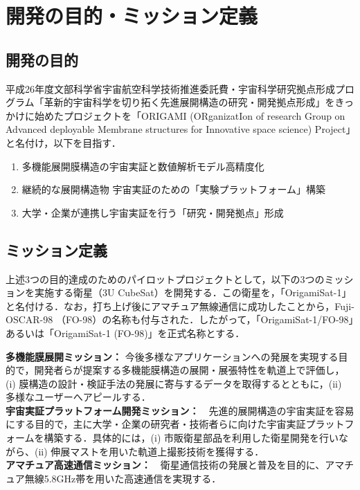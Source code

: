 \section{開発の目的・ミッション定義}

\subsection{開発の目的}

平成26年度文部科学省宇宙航空科学技術推進委託費・宇宙科学研究拠点形成プログラム「革新的宇宙科学を切り拓く先進展開構造の研究・開発拠点形成」をきっかけに始めたプロジェクトを「ORIGAMI (ORganizatIon of research Group on Advanced deployable Membrane structures for Innovative space science) Project」と名付け，以下を目指す．
\begin{enumerate}
\item 多機能展開膜構造の宇宙実証と数値解析モデル高精度化
\item 継続的な展開構造物 宇宙実証のための「実験プラットフォーム」構築
\item 大学・企業が連携し宇宙実証を行う「研究・開発拠点」形成
\end{enumerate}

\subsection{ミッション定義}

上述3つの目的達成のためのパイロットプロジェクトとして，以下の3つのミッションを実施する衛星（3U CubeSat）を開発する．この衛星を，「OrigamiSat-1」と名付ける．なお，打ち上げ後にアマチュア無線通信に成功したことから，Fuji-OSCAR-98 （FO-98）の名称も付与された．したがって，「OrigamiSat-1/FO-98」あるいは「OrigamiSat-1 (FO-98)」を正式名称とする．
\begin{screen}
\noindent
\textbf{多機能膜展開ミッション：} 今後多様なアプリケーションへの発展を実現する目的で，開発者らが提案する多機能膜構造の展開・展張特性を軌道上で評価し，
(i) 膜構造の設計・検証手法の発展に寄与するデータを取得するとともに，(ii) 多様なユーザーへアピールする．\\
\noindent
\textbf{宇宙実証プラットフォーム開発ミッション：}　先進的展開構造の宇宙実証を容易にする目的で，主に大学・企業の研究者・技術者らに向けた宇宙実証プラットフォームを構築する．具体的には，(i) 市販衛星部品を利用した衛星開発を行いながら、(ii) 伸展マストを用いた軌道上撮影技術を獲得する．\\
\noindent
\textbf{アマチュア高速通信ミッション：}　衛星通信技術の発展と普及を目的に、アマチュア無線5.8GHz帯を用いた高速通信を実現する．
\end{screen}
\\

